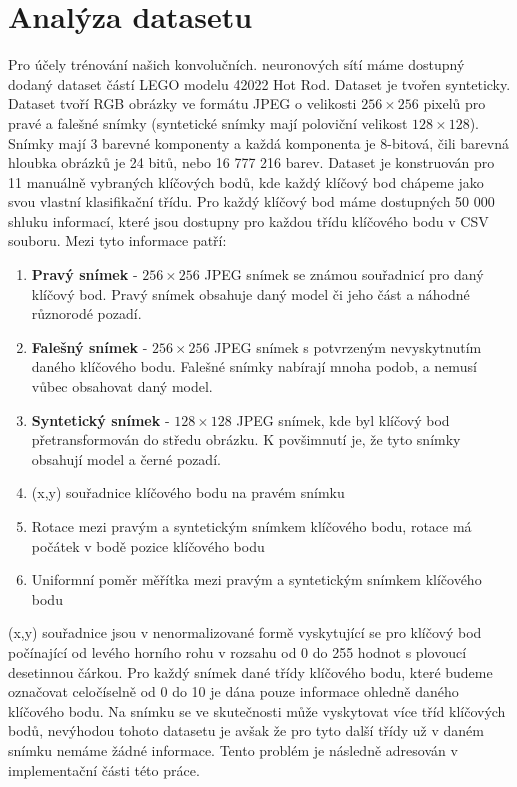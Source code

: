 \section{Analýza datasetu}
\label{sec:Chapter31}
Pro účely trénování našich konvolučních. neuronových sítí máme dostupný dodaný dataset částí LEGO modelu 42022 Hot Rod. Dataset je tvořen synteticky. Dataset tvoří RGB obrázky ve formátu JPEG o velikosti $256\times256$ pixelů pro pravé a falešné snímky (syntetické snímky mají poloviční velikost $128\times128$). Snímky mají 3 barevné komponenty a každá komponenta je 8-bitová, čili barevná hloubka obrázků je 24 bitů, nebo 16 777 216 barev. Dataset je konstruován pro 11 manuálně vybraných klíčových bodů, kde každý klíčový bod chápeme jako svou vlastní klasifikační třídu. Pro každý klíčový bod máme dostupných 50 000 shluku informací, které jsou dostupny pro každou třídu klíčového bodu v CSV souboru. Mezi tyto informace patří:
\begin{enumerate}
  \item \textbf{Pravý snímek} - $256\times256$ JPEG snímek se známou souřadnicí pro daný klíčový bod. Pravý snímek obsahuje daný model či jeho část a náhodné různorodé pozadí.
  \item \textbf{Falešný snímek} - $256\times256$ JPEG snímek s potvrzeným nevyskytnutím daného klíčového bodu. Falešné snímky nabírají mnoha podob, a nemusí vůbec obsahovat daný model.
  \item \textbf{Syntetický snímek} - $128\times128$ JPEG snímek, kde byl klíčový bod přetransformován do středu obrázku. K povšimnutí je, že tyto snímky obsahují model a černé pozadí.
  \item (x,y) souřadnice klíčového bodu na pravém snímku
  \item Rotace mezi pravým a syntetickým snímkem klíčového bodu, rotace má počátek v bodě pozice klíčového bodu
  \item Uniformní poměr měřítka mezi pravým a syntetickým snímkem klíčového bodu
\end{enumerate}

(x,y) souřadnice jsou v nenormalizované formě vyskytující se pro klíčový bod počínající od levého horního rohu v rozsahu od 0 do 255 hodnot s plovoucí desetinnou čárkou. Pro každý snímek dané třídy klíčového bodu, které budeme označovat celočíselně od 0 do 10 je dána pouze informace ohledně daného klíčového bodu. Na snímku se ve skutečnosti může vyskytovat více tříd klíčových bodů, nevýhodou tohoto datasetu je avšak že pro tyto další třídy už v daném snímku nemáme žádné informace. Tento problém je následně adresován v implementační části této práce.



